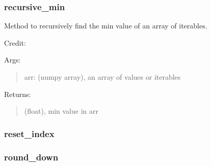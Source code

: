 \documentclass[letterpaper,10pt,english]{sphinxmanual}
\begin{document}
\subsubsection{recursive\_min}
\label{\detokenize{api/mastml.plots.recursive_min:recursive-min}}\label{\detokenize{api/mastml.plots.recursive_min::doc}}

\begin{fulllineitems}
\label{\detokenize{api/mastml.plots.recursive_min:mastml.plots.recursive_min}}
Method to recursively find the min value of an array of iterables.

Credit: 

Args:
\begin{quote}

arr: (numpy array), an array of values or iterables
\end{quote}

Returns:
\begin{quote}

(float), min value in arr
\end{quote}

\end{fulllineitems}



\subsubsection{reset\_index}
\label{\detokenize{api/mastml.plots.reset_index:reset-index}}\label{\detokenize{api/mastml.plots.reset_index::doc}}

\begin{fulllineitems}
\label{\detokenize{api/mastml.plots.reset_index:mastml.plots.reset_index}}
\end{fulllineitems}



\subsubsection{round\_down}
\label{\detokenize{api/mastml.plots.round_down:round-down}}\label{\detokenize{api/mastml.plots.round_down::doc}}
\end{document}

